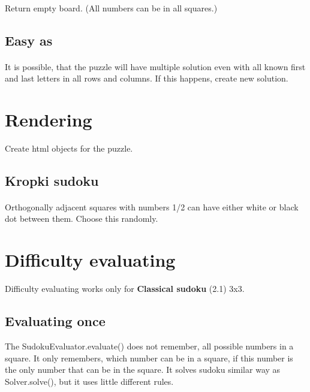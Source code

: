 \documentclass{report}
\begin{document}
\paragraph{}
Return empty board. (All numbers can be in all squares.)

\subsection{Easy as}

\paragraph{}
It is possible, that the puzzle will have multiple solution even with all known first and last letters in all rows and columns. If this happens, create new solution.

\section{Rendering}

Create html objects for the puzzle.

\subsection{Kropki sudoku}

\paragraph{}
Orthogonally adjacent squares with numbers 1/2 can have either white or black dot between them. Choose this randomly.

\section{Difficulty evaluating}

Difficulty evaluating works only for \textbf{Classical sudoku} (2.1) 3x3.

\subsection{Evaluating once}

The SudokuEvaluator.evaluate() does not remember, all possible numbers in a square. It only remembers, which number can be in a square, if this number is the only number that can be in the square. It solves sudoku similar way as Solver.solve(), but it uses little different rules.
\end{document}
